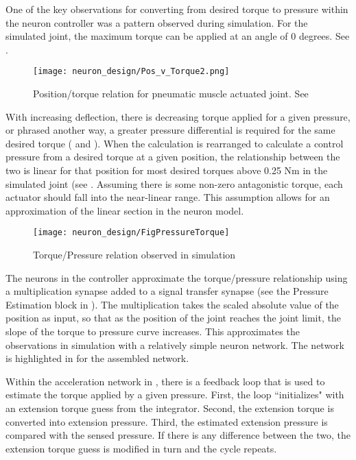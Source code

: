 
One of the key observations for converting from desired torque to pressure 
within the neuron controller was a pattern observed during simulation. For the
simulated joint, the maximum torque can be applied at an angle of 0 degrees. See .

\begin{figure}
\centering
\texttt{[image: neuron\_design/Pos\_v\_Torque2.png]}
\caption{Position/torque relation for pneumatic muscle actuated joint. See }
\label{fig:PositionTorque}
\end{figure}

With increasing deflection, there is decreasing torque applied for a given
pressure, or phrased another way, a greater pressure differential is required
for the same desired torque ( and ). When the calculation is rearranged to calculate
a control pressure from a desired torque at a given position, the relationship
between the two is linear for that position for most desired torques above
0.25 Nm in the simulated joint (see . Assuming there is some non-zero antagonistic
torque, each actuator should fall into the near-linear range. This assumption allows for
an approximation of the linear section in the neuron model.

\begin{figure}
\centering
\texttt{[image: neuron\_design/FigPressureTorque]}
\caption{Torque/Pressure relation observed in simulation}
\label{fig:PressureTorque}
\end{figure}

The neurons in the controller approximate the torque/pressure relationship using a multiplication synapse added
to a signal transfer synapse (see the Pressure Estimation block in ). The multiplication takes the scaled absolute 
value of the position as input, so that as the position of the joint reaches
the joint limit, the slope of the torque to pressure curve increases. This
approximates the observations in simulation with a relatively simple neuron
network. The network is highlighted in   for the assembled network.


Within the acceleration network in , there is a feedback loop that is used to 
estimate the torque applied by a given pressure. First, the loop ``initializes"
with an extension torque guess from the integrator. Second, the extension
torque is converted into extension pressure. Third, the estimated extension
pressure is compared with the sensed pressure. If there is any difference between the
two, the extension torque guess is modified in turn and the cycle repeats.

